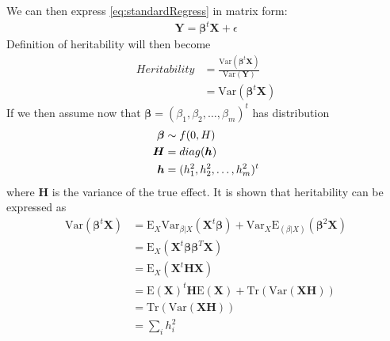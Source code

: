 \documentclass{book}
\begin{document}
			We can then express \cref{eq:standardRegress} in matrix form:
			\begin{align}
				\boldsymbol{Y}=\boldsymbol{\beta}^t\boldsymbol{X}+\epsilon
				\label{eq:matrixRegress}
			\end{align}
			Definition of heritability will then become
			\begin{align}
				Heritability& = \frac{\mathrm{Var}(\boldsymbol{\beta}^t\boldsymbol{X})}{\mathrm{Var}(\boldsymbol{Y})} \nonumber\\
				&=\mathrm{Var}(\boldsymbol{\beta}^t\boldsymbol{X})
			\end{align}
			If we then assume now that $\boldsymbol{\beta} = (\beta_1, \beta_2,\dots,\beta_m)^t$ has distribution
			\begin{align*}
				\boldsymbol{\beta}&\sim f(0,\boldmath{H})\\
				\boldsymbol{H}&=diag(\boldsymbol{h})\\
				\boldsymbol{h}&=(h_1^2,h_2^2,\dots,h_m^2)^t
			\end{align*}
			where $\boldsymbol{H}$ is the variance of the true effect. 
			It is shown that heritability can be expressed as %
			\begin{align}
			\mathrm{Var}(\boldsymbol{\beta}^t\boldsymbol{X}) &= \mathrm{E}_X\mathrm{Var}_{\beta|X}(\boldsymbol{X}^t\boldsymbol{\beta})+\mathrm{Var}_X\mathrm{E}_{(\beta|X)}(\boldsymbol{\beta}^2\boldsymbol{X}) \nonumber\\
			&=\mathrm{E}_X(\boldsymbol{X}^t\boldsymbol{\beta\beta}^T\boldsymbol{X}) \nonumber\\ 
			&= \mathrm{E}_X(\boldsymbol{X}^t\boldsymbol{HX}) \nonumber\\
			&= \mathrm{E}(\boldsymbol{X})^t\boldsymbol{H}\mathrm{E}(\boldsymbol{X})+\mathrm{Tr}(\mathrm{Var}(\boldsymbol{X}\boldsymbol{H})) \nonumber\\
			&=\mathrm{Tr}(\mathrm{Var}(\boldsymbol{X}\boldsymbol{H})) \nonumber\\
			&=\sum_ih_i^2
			\label{eq:proveHerit}
			\end{align}
			
\end{document}
